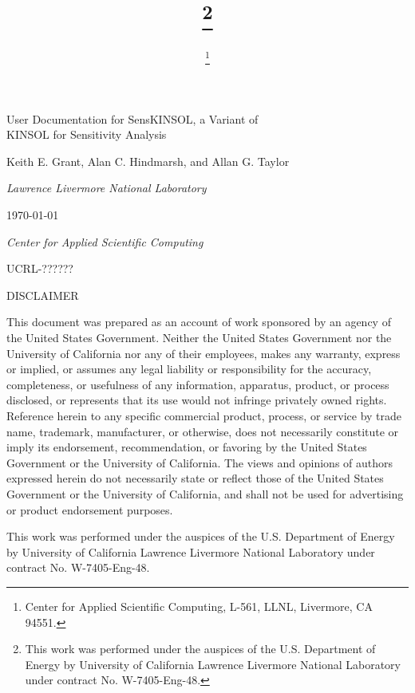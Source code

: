 \documentclass[11pt]{article}
\title{\thisdoc %
\thanks{ This work was performed under the auspices of the U.S.
Department of Energy by University of California Lawrence Livermore
National Laboratory under contract No. W-7405-Eng-48.}}
\author{\writers %
\thanks{Center for Applied Scientific Computing, L-561, LLNL,
Livermore, CA 94551.}}
\newcommand{\thisdoc}{User Documentation for SensKINSOL, a Variant of
\\KINSOL for Sensitivity Analysis}
\newcommand{\writers}{Keith E. Grant, Alan C. Hindmarsh, and Allan
G. Taylor}
\begin{document}
\thispagestyle{empty}


\vspace*{0.1in}

\begin{center}

\LARGE
\thisdoc

\par\vspace*{0.7in}
\large
\writers
\par\bigskip\bigskip

{\em Lawrence Livermore National Laboratory}

\vspace{2in}
\par\large \today
\end{center}

\vfill
\mbox{}
\vfill


\par\Large{\it Center for Applied Scientific Computing}
\vspace*{0.7in}
\par\large UCRL-??????

\newpage
{}


\vspace*{0.25in}

\scriptsize
\begin{center}
\begin{minipage}{4.0in}

\begin{center}
DISCLAIMER
\end{center}

This document was prepared as an account of work sponsored by an agency
of the United States Government. Neither the United States Government
nor the University of California nor any of their employees, makes any
warranty, express or implied, or assumes any legal liability or
responsibility for the accuracy, completeness, or usefulness of any
information, apparatus, product, or process disclosed, or represents
that its use would not infringe privately owned rights. Reference
herein to any specific commercial product, process, or service by trade
name, trademark, manufacturer, or otherwise, does not necessarily
constitute or imply its endorsement, recommendation, or favoring by the
United States Government or the University of California. The views and
opinions of authors expressed herein do not necessarily state or
reflect those of the United States Government or the University of
California, and shall not be used for advertising or product
endorsement purposes.

\medskip
This work was performed under the auspices of the U.S. Department of
Energy by University of California Lawrence Livermore National
Laboratory under contract No. W-7405-Eng-48.
\end{minipage}
\end{center}
\normalsize
\end{document}
